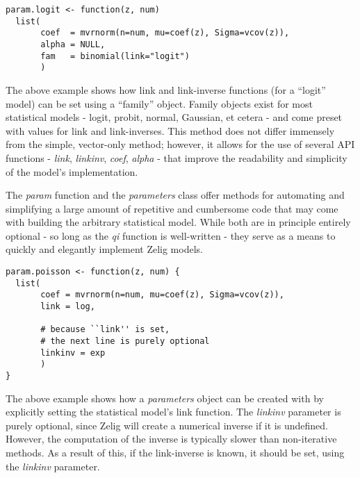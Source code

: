 
\begin{verbatim}
param.logit <- function(z, num)
  list(
       coef  = mvrnorm(n=num, mu=coef(z), Sigma=vcov(z)),
       alpha = NULL,
       fam   = binomial(link="logit")
       )
\end{verbatim}



The above example shows how link and link-inverse functions (for a ``logit'' model) can be set using a ``family'' object.  Family objects exist for most statistical models - logit, probit, normal, Gaussian, et cetera - and come preset with values for link and link-inverses.  This method does not differ immensely from the simple, vector-only method; however, it allows for the use of several API functions - \emph{link}, \emph{linkinv}, \emph{coef}, \emph{alpha} - that improve the readability and simplicity of the model's implementation.

The \emph{param} function and the \emph{parameters} class offer methods for automating and simplifying a large amount of repetitive and cumbersome code that may come with building the arbitrary statistical model.  While both are in principle entirely optional - so long as the \emph{qi} function is well-written - they serve as a means to quickly and elegantly implement Zelig models.



\begin{verbatim}
param.poisson <- function(z, num) {
  list(
       coef = mvrnorm(n=num, mu=coef(z), Sigma=vcov(z)),
       link = log,
             
       # because ``link'' is set,
       # the next line is purely optional
       linkinv = exp
       )
}
\end{verbatim}



The above example shows how a \emph{parameters} object can be created with by explicitly setting the statistical model's link function.  The \emph{linkinv} parameter is purely optional, since Zelig will create a numerical inverse if it is undefined.  However, the computation of the inverse is typically slower than non-iterative methods.  As a result of this, if the link-inverse is known, it should be set, using the \emph{linkinv} parameter.

